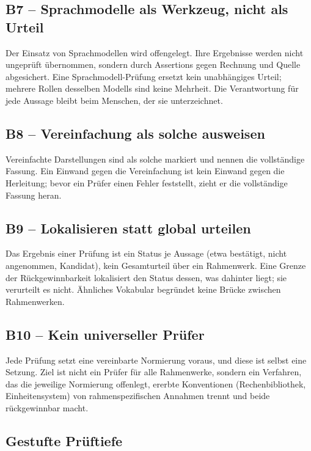 \subsection*{B7 -- Sprachmodelle als Werkzeug, nicht als Urteil}
Der Einsatz von Sprachmodellen wird offengelegt. Ihre Ergebnisse werden nicht ungeprüft
übernommen, sondern durch Assertions gegen Rechnung und Quelle abgesichert. Eine
Sprachmodell-Prüfung ersetzt kein unabhängiges Urteil; mehrere Rollen desselben Modells
sind keine Mehrheit. Die Verantwortung für jede Aussage bleibt beim Menschen, der sie
unterzeichnet.

\subsection*{B8 -- Vereinfachung als solche ausweisen}
Vereinfachte Darstellungen sind als solche markiert und nennen die vollständige Fassung.
Ein Einwand gegen die Vereinfachung ist kein Einwand gegen die Herleitung; bevor ein
Prüfer einen Fehler feststellt, zieht er die vollständige Fassung heran.

\subsection*{B9 -- Lokalisieren statt global urteilen}
Das Ergebnis einer Prüfung ist ein Status je Aussage (etwa bestätigt, nicht angenommen,
Kandidat), kein Gesamturteil über ein Rahmenwerk. Eine Grenze der Rückgewinnbarkeit
lokalisiert den Status dessen, was dahinter liegt; sie verurteilt es nicht. Ähnliches
Vokabular begründet keine Brücke zwischen Rahmenwerken.

\subsection*{B10 -- Kein universeller Prüfer}
Jede Prüfung setzt eine vereinbarte Normierung voraus, und diese ist selbst eine Setzung.
Ziel ist nicht ein Prüfer für alle Rahmenwerke, sondern ein Verfahren, das die jeweilige
Normierung offenlegt, ererbte Konventionen (Rechenbibliothek, Einheitensystem) von
rahmenspezifischen Annahmen trennt und beide rückgewinnbar macht.

\subsection{Gestufte Prüftiefe}


